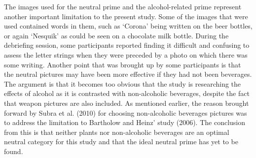 \documentclass[authordate, serif, review]{jote-article}
\begin{document}
\begin{multicols}{2}
The images used for the neutral prime and the alcohol-related prime represent another important limitation to the present study. Some of the images that were used contained words in them, such as `Corona' being written on the beer bottles, or again `Nesquik' as could be seen on a chocolate milk bottle. During the debriefing session, some participants reported finding it difficult and confusing to assess the letter strings when they were preceded by a photo on which there was some writing. Another point that was brought up by some participants is that the neutral pictures may have been more effective if they had not been beverages. The argument is that it becomes too obvious that the study is researching the effects of alcohol as it is contrasted with non-alcoholic beverages, despite the fact that weapon pictures are also included. As mentioned earlier, the reason brought forward by Subra et al. (2010) for choosing non-alcoholic beverages pictures was to address the limitation to Bartholow and Heinz' study (2006). The conclusion from this is that neither plants nor non-alcoholic beverages are an optimal neutral category for this study and that the ideal neutral prime has yet to be found.  


\end{multicols}
\end{document}
